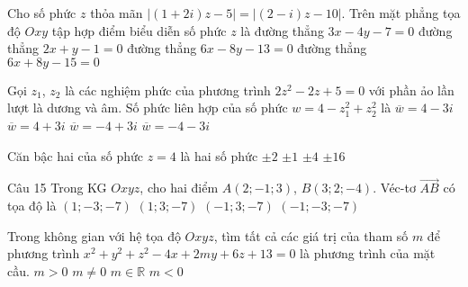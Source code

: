 \begin{ex}%
Cho số phức $z$ thỏa mãn $|(1+2i)z-5|=|(2-i)z-10|$. Trên mặt phẳng tọa độ $Oxy$ tập hợp điểm biểu diễn số phức $z$ là
\choice
{đường thẳng $3x-4y-7=0$}
{đường thẳng $2x+y-1=0$}
{\True đường thẳng $6x-8y-13=0$}
{đường thẳng $6x+8y-15=0$}
\end{ex}

\begin{ex}%
Gọi $z_1$, $z_2$ là các nghiệm phức của phương trình $2z^2-2z+5=0$ với phần ảo lần lượt là dương và âm. Số phức liên hợp của số phức $w=4-z_1^2+z_2^2$ là
\choice
{$\overline{w}=4-3i$}
{\True $\overline{w}=4+3i$}
{$\overline{w}=-4+3i$}
{$\overline{w}=-4-3i$}
\end{ex}

\begin{ex}%
Căn bậc hai của số phức $z=4$ là hai số phức
\choice
{\True $\pm 2$}
{$\pm 1$}
{$\pm 4$}
{$\pm 16$}
\end{ex}

\begin{ex}Câu 15%
Trong KG $Oxyz$, cho hai điểm $A(2;-1;3)$, $B(3;2;-4)$. Véc-tơ $\overrightarrow{AB}$ có tọa độ là
\choice
{$(1;-3;-7)$}
{\True $(1;3;-7)$}
{$(-1;3;-7)$}
{$(-1;-3;-7)$}
\end{ex}

\begin{ex}%
Trong không gian với hệ tọa độ $O x y z$, tìm tất cả các giá trị của tham số $m$ để phương trình $x^{2}+y^{2}+z^{2}-4 x+2 m y+6 z+13=0$ là phương trình của mặt cầu.
\choice
{$m>0$}
{\True $m \neq 0$}
{$m \in \mathbb{R}$}
{$m<0$}
\end{ex}

